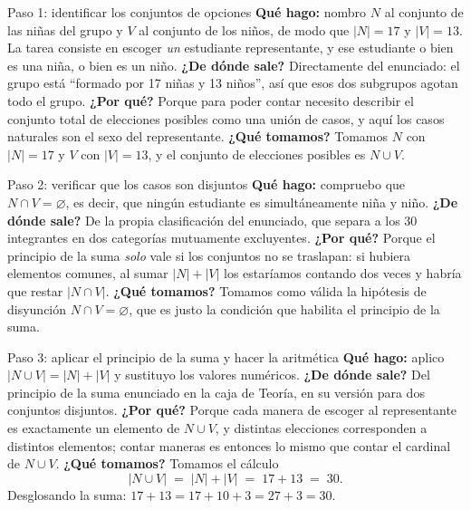 \documentclass[11pt]{article}
\begin{document}
\begin{sol}

\begin{paso}{Paso 1: identificar los conjuntos de opciones}
\textbf{Qu\'e hago:} nombro $N$ al conjunto de las ni\~nas del grupo y $V$ al conjunto de los ni\~nos, de modo que $|N|=17$ y $|V|=13$. La tarea consiste en escoger \emph{un} estudiante representante, y ese estudiante o bien es una ni\~na, o bien es un ni\~no.
\textbf{¿De d\'onde sale?} Directamente del enunciado: el grupo est\'a ``formado por 17 ni\~nas y 13 ni\~nos'', as\'i que esos dos subgrupos agotan todo el grupo.
\textbf{¿Por qu\'e?} Porque para poder contar necesito describir el conjunto total de elecciones posibles como una uni\'on de casos, y aqu\'i los casos naturales son el sexo del representante.
\textbf{¿Qu\'e tomamos?} Tomamos $N$ con $|N|=17$ y $V$ con $|V|=13$, y el conjunto de elecciones posibles es $N\cup V$.
\end{paso}

\begin{paso}{Paso 2: verificar que los casos son disjuntos}
\textbf{Qu\'e hago:} compruebo que $N\cap V=\varnothing$, es decir, que ning\'un estudiante es simult\'aneamente ni\~na y ni\~no.
\textbf{¿De d\'onde sale?} De la propia clasificaci\'on del enunciado, que separa a los 30 integrantes en dos categor\'ias mutuamente excluyentes.
\textbf{¿Por qu\'e?} Porque el principio de la suma \emph{solo} vale si los conjuntos no se traslapan: si hubiera elementos comunes, al sumar $|N|+|V|$ los estar\'iamos contando dos veces y habr\'ia que restar $|N\cap V|$.
\textbf{¿Qu\'e tomamos?} Tomamos como v\'alida la hip\'otesis de disyunci\'on $N\cap V=\varnothing$, que es justo la condici\'on que habilita el principio de la suma.
\end{paso}

\begin{paso}{Paso 3: aplicar el principio de la suma y hacer la aritm\'etica}
\textbf{Qu\'e hago:} aplico $|N\cup V|=|N|+|V|$ y sustituyo los valores num\'ericos.
\textbf{¿De d\'onde sale?} Del principio de la suma enunciado en la caja de Teor\'ia, en su versi\'on para dos conjuntos disjuntos.
\textbf{¿Por qu\'e?} Porque cada manera de escoger al representante es exactamente un elemento de $N\cup V$, y distintas elecciones corresponden a distintos elementos; contar maneras es entonces lo mismo que contar el cardinal de $N\cup V$.
\textbf{¿Qu\'e tomamos?} Tomamos el c\'alculo
\[
|N\cup V| \;=\; |N|+|V| \;=\; 17+13 \;=\; 30 .
\]
Desglosando la suma: $17+13 = 17+10+3 = 27+3 = 30$.
\end{paso}


\end{sol}
\end{document}
